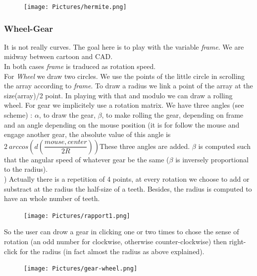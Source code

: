 \documentclass{article}
\begin{document}
\begin{figure}[H]
	\center
   \texttt{[image: Pictures/hermite.png]}
\end{figure}
\subsubsection*{Wheel-Gear}
It is not really curves. The goal here is to play with the variable \textit{frame}. We are midway between cartoon and CAD.\\
In both cases \textit{frame} is traduced as rotation speed. \\
For \textit{Wheel} we draw two circles. We use the points of the little circle in scrolling the array according to \textit{frame}. To draw a radius we link a point of the array at the size(array)/2 point. In playing with that and modulo we can draw a rolling wheel.
For gear we implicitely use a rotation matrix. We have three angles (see scheme) : $\alpha$, to draw the gear, $\beta$, to make rolling the gear, depending on frame and an angle depending on the mouse position (it is for follow the mouse and engage another gear, the absolute value of this angle is $2\ arccos(d(\dfrac{mouse,center}{2 R}))$These three angles are added. $\beta$ is computed such that the angular speed of whatever gear be the same ($\beta$ is inversely proportional to the radius).\\ )
Actually there is a repetition of 4 points, at every rotation we choose to add or substract at the radius the half-size of a teeth. Besides, the radius is computed to have an whole number of teeth.\\
\begin{figure}[H]
	\center
   \texttt{[image: Pictures/rapport1.png]}
\end{figure}
So the user can drow a gear in clicking one or two times to chose the sense of rotation (an odd number for clockwise, otherwise counter-clockwise) then right-click for the radius (in fact almost the radius as above explained).
\begin{figure}[H]
	\center
   \texttt{[image: Pictures/gear-wheel.png]}
\end{figure}
\end{document}
